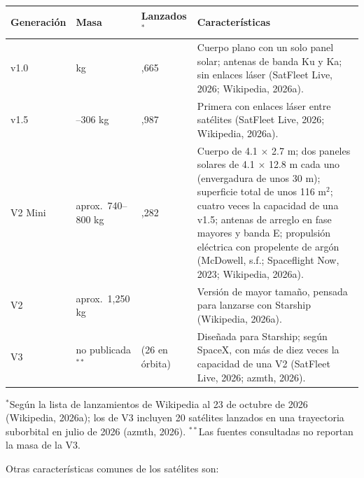 \documentclass[12pt,letterpaper]{article}
\begin{document}
\begin{center}
\small
\begin{tabular}{|>{\raggedright\arraybackslash}p{2.3cm}|>{\raggedright\arraybackslash}p{2.4cm}|>{\raggedright\arraybackslash}p{2.1cm}|>{\raggedright\arraybackslash}p{7.0cm}|}
\hline
\textbf{Generación} & \textbf{Masa} & \textbf{Lanzados$^*$} & \textbf{Características} \\
\hline
v1.0 & 260 kg & 1,665 & Cuerpo plano con un solo panel solar; antenas de banda Ku y Ka; sin enlaces láser (SatFleet Live, 2026; Wikipedia, 2026a). \\
\hline
v1.5 & 295--306 kg & 2,987 & Primera con enlaces láser entre satélites (SatFleet Live, 2026; Wikipedia, 2026a). \\
\hline
V2 Mini & aprox.\ 740--800 kg & 8,282 & Cuerpo de 4.1 $\times$ 2.7 m; dos paneles solares de 4.1 $\times$ 12.8 m cada uno (envergadura de unos 30 m); superficie total de unos 116 m$^2$; cuatro veces la capacidad de una v1.5; antenas de arreglo en fase mayores y banda E; propulsión eléctrica con propelente de argón (McDowell, s.f.; Spaceflight Now, 2023; Wikipedia, 2026a). \\
\hline
V2 & aprox.\ 1,250 kg & 38 & Versión de mayor tamaño, pensada para lanzarse con Starship (Wikipedia, 2026a). \\
\hline
V3 & no publicada$^{**}$ & 46 (26 en órbita) & Diseñada para Starship; según SpaceX, con más de diez veces la capacidad de una V2 (SatFleet Live, 2026; azmth, 2026). \\
\hline
\end{tabular}
\end{center}

{\footnotesize $^*$Según la lista de lanzamientos de Wikipedia al 23 de octubre de 2026 (Wikipedia, 2026a); los de V3 incluyen 20 satélites lanzados en una trayectoria suborbital en julio de 2026 (azmth, 2026). $^{**}$Las fuentes consultadas no reportan la masa de la V3.}

Otras características comunes de los satélites son:
\end{document}
